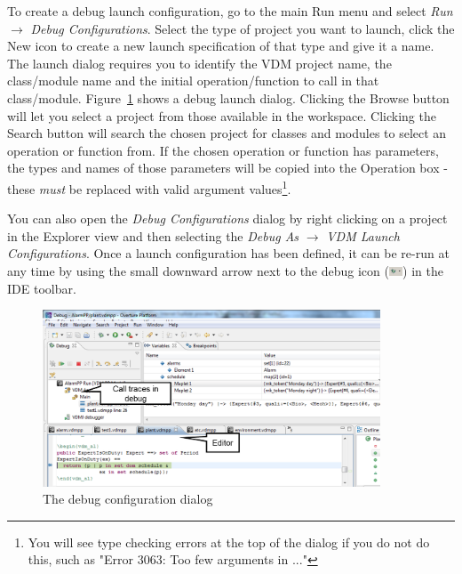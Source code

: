 \documentclass{overturerepchap}
\begin{document}
To create a debug launch configuration, go to the main Run menu and select
\emph{Run} $\rightarrow $ \emph{Debug Configurations}. Select the type of
project you want to launch, click the New icon to
create a new launch specification of that type and give it a name. The
launch dialog requires you to identify the VDM project name,
the class/module name and the initial operation/function to call in that
class/module. Figure~\ref{fig:userguide:debugConfiguration} shows a debug launch
dialog. Clicking the Browse button will let you select a project from
those available in the workspace. Clicking the Search button will search the chosen
project for classes and modules to select an operation or function from.
If the chosen operation or function has parameters, the types and names of those
parameters will be copied into the Operation box - these \emph{must} be replaced with
valid argument values\footnote{You will see type checking errors at the top of the dialog
if you do not do this, such as "Error 3063: Too few arguments in ..."}.

You can also open the
\emph{Debug Configurations} dialog by right clicking on a project in the Explorer
view and then selecting the \emph{Debug As} $\rightarrow$ \emph{VDM Launch Configurations}.
Once a launch configuration has been defined, it can be re-run at any time by using the
small downward arrow next to the debug icon
(\includegraphics[width=0.03\textwidth]{icons/debuggericon}) in the IDE toolbar.


\begin{figure}[htp]
\begin{center}
  \includegraphics[width=380px]{figures/debugConfiguration}
  \caption{The debug configuration dialog}
  \label{fig:userguide:debugConfiguration}
\end{center}
\end{figure}
\end{document}
